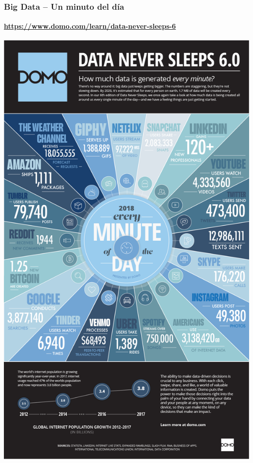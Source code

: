 \documentclass[14pt]{beamer}
\begin{document}
\begin{frame}
  \frametitle{Big Data -- Un minuto del día}
  \framesubtitle{\url{https://www.domo.com/learn/data-never-sleeps-6}}
  \centering\includegraphics[height=.8\textheight]{img/data-never-sleeps-6}
\end{frame}
\end{document}
